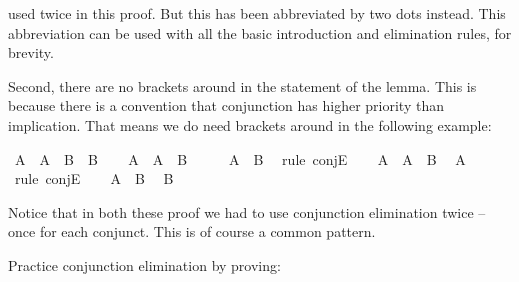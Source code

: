 \begin{isabellebody}
\begin{isamarkuptext}
used twice in this proof. But this has been abbreviated by two dots instead. This abbreviation can
be used with all the basic introduction and elimination rules, for brevity.%
\end{isamarkuptext}\isamarkuptrue%
%
\begin{isamarkuptext}%
Second, there are no brackets around  in the statement of the lemma. This is
because there is a convention that conjunction has higher priority than implication. That means we
do need brackets around  in the following example:%
\end{isamarkuptext}\isamarkuptrue%
\isamarkupfalse%
\ {\isachardoublequoteopen}A\ {\isasymand}\ {\isacharparenleft}A\ {\isasymlongrightarrow}\ B{\isacharparenright}\ {\isasymlongrightarrow}\ B{\isachardoublequoteclose}\isanewline
%
\isadelimproof
%
\endisadelimproof
%
\isatagproof
{}\isamarkupfalse%
\isanewline
\ \ \isamarkupfalse%
\ {\isachardoublequoteopen}A\ {\isasymand}\ {\isacharparenleft}A\ {\isasymlongrightarrow}\ B{\isacharparenright}{\isachardoublequoteclose}\isanewline
\ \ \isamarkupfalse%
\ \isamarkupfalse%
\ {\isachardoublequoteopen}A\ {\isasymlongrightarrow}\ B{\isachardoublequoteclose}\ \isamarkupfalse%
\ {\isacharparenleft}rule\ conjE{\isacharparenright}\isanewline
\ \ \isamarkupfalse%
\ {\isacharbackquoteopen}A\ {\isasymand}\ {\isacharparenleft}A\ {\isasymlongrightarrow}\ B{\isacharparenright}{\isacharbackquoteclose}\ \isamarkupfalse%
\ {\isachardoublequoteopen}A{\isachardoublequoteclose}\ \isamarkupfalse%
\ {\isacharparenleft}rule\ conjE{\isacharparenright}\isanewline
\ \ \isamarkupfalse%
\ {\isacharbackquoteopen}A\ {\isasymlongrightarrow}\ B{\isacharbackquoteclose}\ \isamarkupfalse%
\ {\isachardoublequoteopen}B{\isachardoublequoteclose}\isacommand{{\isachardot}{\isachardot}}\isamarkupfalse%
\isanewline
{}\isamarkupfalse%
%
\endisatagproof
{\isafoldproof}%
%
\isadelimproof
%
\endisadelimproof
%
\begin{isamarkuptext}%
Notice that in both these proof we had to use conjunction elimination twice -- once for each
conjunct. This is of course a common pattern.%
\end{isamarkuptext}\isamarkuptrue%
%
\begin{isamarkuptext}%
\begin{Exercise}[title = Strengthening the Antecedent] Practice conjunction elimination by proving: \end{Exercise}%

\end{isamarkuptext}
\end{isabellebody}
